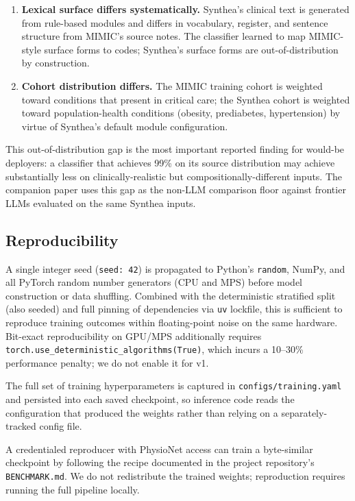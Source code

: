 \begin{enumerate}
\def\labelenumi{\arabic{enumi}.}
\tightlist
\item
  \textbf{Lexical surface differs systematically.} Synthea's clinical
  text is generated from rule-based modules and differs in vocabulary,
  register, and sentence structure from MIMIC's source notes. The
  classifier learned to map MIMIC-style surface forms to codes;
  Synthea's surface forms are out-of-distribution by construction.
\item
  \textbf{Cohort distribution differs.} The MIMIC training cohort is
  weighted toward conditions that present in critical care; the
  Synthea cohort is weighted toward population-health conditions
  (obesity, prediabetes, hypertension) by virtue of Synthea's
  default module configuration.
\end{enumerate}

This out-of-distribution gap is the most important reported
finding for would-be deployers: a classifier that achieves 99\% on
its source distribution may achieve substantially less on
clinically-realistic but compositionally-different inputs. The
companion paper \autocite{FungPhantomCodes2026} uses this gap as the
non-LLM comparison floor against frontier LLMs evaluated on the
same Synthea inputs.

\subsection{Reproducibility}\label{reproducibility}

A single integer seed (\texttt{seed:\ 42}) is propagated to Python's
\texttt{random}, NumPy, and all PyTorch random number generators (CPU
and MPS) before model construction or data shuffling. Combined
with the deterministic stratified split (also seeded) and full
pinning of dependencies via \texttt{uv} lockfile, this is sufficient to
reproduce training outcomes within floating-point noise on the
same hardware. Bit-exact reproducibility on GPU/MPS additionally
requires \texttt{torch.use\_deterministic\_algorithms(True)}, which incurs
a 10--30\% performance penalty; we do not enable it for v1.

The full set of training hyperparameters is captured in
\texttt{configs/training.yaml} and persisted into each saved checkpoint,
so inference code reads the configuration that produced the
weights rather than relying on a separately-tracked config file.

A credentialed reproducer with PhysioNet access can train a
byte-similar checkpoint by following the recipe documented in the
project repository's \texttt{BENCHMARK.md}. We do not redistribute the
trained weights; reproduction requires running the full pipeline
locally.
